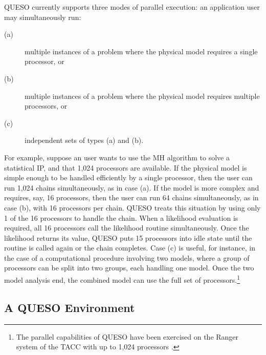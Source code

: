 QUESO currently supports three modes of parallel execution:
an application user may simultaneously run:
\begin{description}
\item[(a)] multiple instances of a problem where the physical model requires a single processor, or
\item[(b)] multiple instances of a problem where the physical model requires multiple processors, or
\item[(c)] independent sets of types (a) and (b).
\end{description}
%
For example, suppose an user wants to use the MH algorithm to solve a statistical IP, and that 1,024 processors are available.
If the physical model is simple enough to be handled efficiently by a single processor, then the user can run 1,024 chains simultaneously, as in case (a).
If the model is more complex and requires, say, 16 processors, then the user can run 64 chains simultaneously, as in case (b), with 16 processors per chain.
QUESO treats this situation by using only 1 of the 16 processors to handle the chain.
When a likelihood evaluation is required, all 16 processors call the likelihood routine simultaneously.
Once the likelihood returns its value, QUESO puts  15 processors into idle state until the routine is called again or the chain completes.
Case (c) is useful, for instance, in the case of a computational procedure involving two models,
where a group of processors can be split into two groups, each handling one model.
Once the two model analysis end, the combined model can use the full set of processors.\footnote{The parallel capabilities of QUESO have been exercised on the Ranger system of the TACC \cite{tacc} with up to 1,024 processors \cite{ChOlPr10}.}




\subsection{A QUESO Environment}

